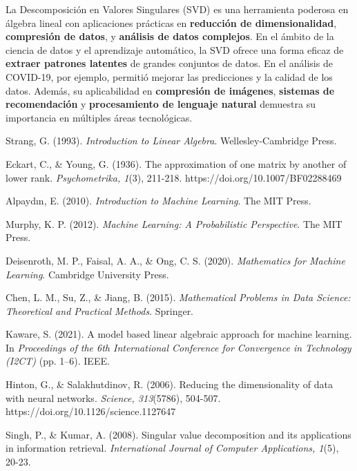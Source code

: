 \documentclass{article}
\begin{document}
La Descomposición en Valores Singulares (SVD) es una herramienta poderosa en álgebra lineal con aplicaciones prácticas en \textbf{reducción de dimensionalidad}, \textbf{compresión de datos}, y \textbf{análisis de datos complejos}. En el ámbito de la ciencia de datos y el aprendizaje automático, la SVD ofrece una forma eficaz de \textbf{extraer patrones latentes} de grandes conjuntos de datos. En el análisis de COVID-19, por ejemplo, permitió mejorar las predicciones y la calidad de los datos. Además, su aplicabilidad en \textbf{compresión de imágenes}, \textbf{sistemas de recomendación} y \textbf{procesamiento de lenguaje natural} demuestra su importancia en múltiples áreas tecnológicas.

\begin{thebibliography}{99}

 Strang, G. (1993). \textit{Introduction to Linear Algebra}. Wellesley-Cambridge Press.

 Eckart, C., \& Young, G. (1936). The approximation of one matrix by another of lower rank. \textit{Psychometrika, 1}(3), 211-218. https://doi.org/10.1007/BF02288469

 Alpaydın, E. (2010). \textit{Introduction to Machine Learning}. The MIT Press.

 Murphy, K. P. (2012). \textit{Machine Learning: A Probabilistic Perspective}. The MIT Press.

 Deisenroth, M. P., Faisal, A. A., \& Ong, C. S. (2020). \textit{Mathematics for Machine Learning}. Cambridge University Press.

 Chen, L. M., Su, Z., \& Jiang, B. (2015). \textit{Mathematical Problems in Data Science: Theoretical and Practical Methods}. Springer.

 Kaware, S. (2021). A model based linear algebraic approach for machine learning. In \textit{Proceedings of the 6th International Conference for Convergence in Technology (I2CT)} (pp. 1–6). IEEE.

 Hinton, G., \& Salakhutdinov, R. (2006). Reducing the dimensionality of data with neural networks. \textit{Science, 313}(5786), 504-507. https://doi.org/10.1126/science.1127647

 Singh, P., \& Kumar, A. (2008). Singular value decomposition and its applications in information retrieval. \textit{International Journal of Computer Applications, 1}(5), 20-23.


\end{thebibliography}
\end{document}
